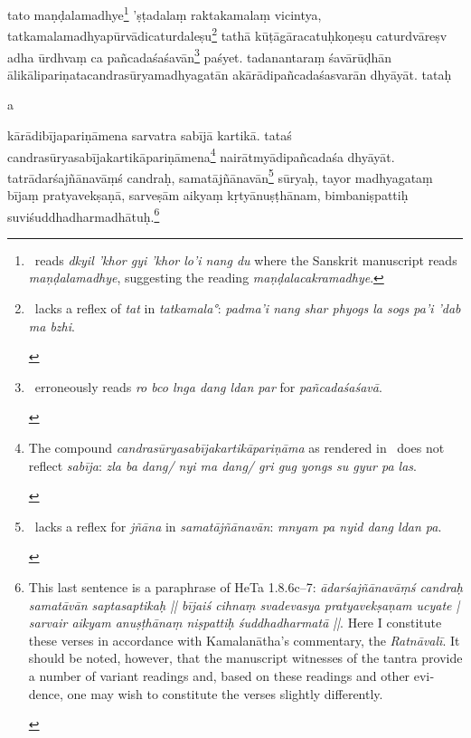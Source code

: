 \documentclass[naipra.tex]{subfiles}
\begin{document}
\begin{sanskrit}
\pstart
tato maṇḍalamadhye\footnote{
	\TIB\ reads \emph{dkyil 'khor gyi 'khor lo'i nang du} where the Sanskrit manuscript reads \emph{maṇḍalamadhye}, suggesting the reading \emph{maṇḍalacakramadhye}.
} 'ṣṭadalaṃ raktakamalaṃ vicintya, tatkamalamadhyapūrvādicaturdaleṣu\footnote{\begin{english}
	\TIB\ lacks a reflex of \emph{tat} in \emph{tatkamala°}: \emph{padma'i nang shar phyogs la sogs pa'i 'dab ma bzhi}.
\end{english}} tathā kūṭāgāracatuḥkoṇeṣu caturdvāreṣv adha ūrdhvaṃ ca pañcadaśaśavān\footnote{\begin{english}
	\TIB\ erroneously reads \emph{ro bco lnga dang ldan par} for \emph{pañcadaśaśavā}.
\end{english}} paśyet. 
tadanantaraṃ śavārūḍhān ālikālipariṇatacandrasūryamadhyagatān akārādipañcadaśasvarān dhyāyāt.
tataḥ \begin{mantra}a\end{mantra}\dsh kārādibījapariṇāmena sarvatra sabījā kartikā.
tataś candrasūryasabījakartikāpariṇāmena\footnote{\begin{english}
	The compound \emph{candrasūryasabījakartikāpariṇāma} as rendered in \TIB\ does not reflect \emph{sabīja}: \emph{zla ba dang/ nyi ma dang/ gri gug yongs su gyur pa las}.
\end{english}} nairātmyādipañcadaśa dhyāyāt. 
tatrādarśajñānavāṃś candraḥ, samatājñānavān\footnote{\begin{english}
	\TIB\ lacks a reflex for \emph{jñāna} in \emph{samatājñānavān}: \emph{mnyam pa nyid dang ldan pa}. 
\end{english}} sūryaḥ, tayor madhyagataṃ bījaṃ pratyavekṣaṇā, sarveṣām aikyaṃ kṛtyānuṣṭhānam, bimbaniṣpattiḥ suviśuddhadharmadhātuḥ.\footnote{
	\begin{english}%
		This last sentence is a paraphrase of HeTa 1.8.6c–7: \emph{ādarśajñānavāṃś candraḥ samatāvān saptasaptikaḥ || bījaiś cihnaṃ svadevasya pratyavekṣaṇam ucyate | sarvair aikyam anuṣṭhānaṃ niṣpattiḥ śuddhadharmatā ||}.
		Here I constitute these verses in accordance with Kamalanātha's commentary, the \emph{Ratnāvalī}.
		It should be noted, however, that the manuscript witnesses of the tantra provide a number of variant readings and, based on these readings and other evidence, one may wish to constitute the verses slightly differently.
	\end{english}
}
\pend



\end{sanskrit}
\end{document}
